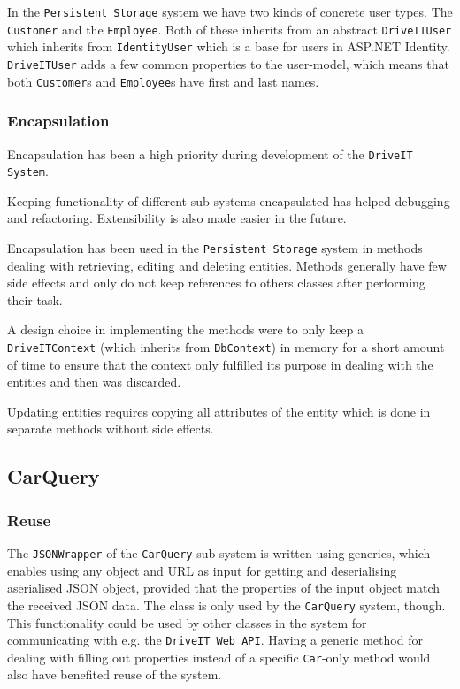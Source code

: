 In the \texttt{Persistent Storage} system we have two kinds of concrete user types. The \texttt{Customer} and the \texttt{Employee}. Both of these inherits from an abstract \texttt{DriveITUser} which inherits from \texttt{IdentityUser} which is a base for users in ASP.NET Identity. \texttt{DriveITUser} adds a few common properties to the user-model, which means that both \texttt{Customer}s and \texttt{Employee}s have first and last names.

\subsubsection{Encapsulation}
Encapsulation has been a high priority during development of the \texttt{DriveIT System}. 

Keeping functionality of different sub systems encapsulated has helped debugging and refactoring. Extensibility is also made easier in the future.

Encapsulation has been used in the \texttt{Persistent Storage} system in methods dealing with retrieving, editing and deleting entities. Methods generally have few side effects and only do not keep references to others classes after performing their task.

A design choice in implementing the methods were to only keep a \texttt{DriveITContext} (which inherits from \texttt{DbContext}) in memory for a short amount of time to ensure that the context only fulfilled its purpose in dealing with the entities and then was discarded.

Updating entities requires copying all attributes of the entity which is done in separate methods without side effects.

\subsection{CarQuery}

\subsubsection{Reuse}
The \texttt{JSONWrapper} of the \texttt{CarQuery} sub system is written using generics, which enables using any object and URL as input for getting and deserialising aserialised JSON object, provided that the properties of the input object match the received JSON data. 
The class is only used by the \texttt{CarQuery} system, though. This functionality could be used by other classes in the system for communicating with e.g. the \texttt{DriveIT Web API}. 
Having a generic method for dealing with filling out properties instead of a specific \texttt{Car}-only method would also have benefited reuse of the system.


